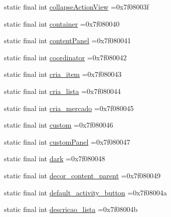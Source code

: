 \begin{DoxyCompactItemize}
static final int \mbox{\hyperlink{classbr_1_1unb_1_1cic_1_1mp_1_1marketmaster_1_1R_1_1id_aaf084224721b052286e8705de8739a77}{collapse\+Action\+View}} =0x7f08003f
\item 
static final int \mbox{\hyperlink{classbr_1_1unb_1_1cic_1_1mp_1_1marketmaster_1_1R_1_1id_acba46c2bdac6578a3fc3a2d7f2d78f9a}{container}} =0x7f080040
\item 
static final int \mbox{\hyperlink{classbr_1_1unb_1_1cic_1_1mp_1_1marketmaster_1_1R_1_1id_a7e37b4ff866fd1ce679cc51fcad78c18}{content\+Panel}} =0x7f080041
\item 
static final int \mbox{\hyperlink{classbr_1_1unb_1_1cic_1_1mp_1_1marketmaster_1_1R_1_1id_a469dc3e9f3bf441afc564ad10ce01b97}{coordinator}} =0x7f080042
\item 
static final int \mbox{\hyperlink{classbr_1_1unb_1_1cic_1_1mp_1_1marketmaster_1_1R_1_1id_a96395cca1682b29df0b613cd0c5c5503}{cria\+\_\+item}} =0x7f080043
\item 
static final int \mbox{\hyperlink{classbr_1_1unb_1_1cic_1_1mp_1_1marketmaster_1_1R_1_1id_a8b5fad949e93880f3bf9bf0ee85547c4}{cria\+\_\+lista}} =0x7f080044
\item 
static final int \mbox{\hyperlink{classbr_1_1unb_1_1cic_1_1mp_1_1marketmaster_1_1R_1_1id_a22bc94d6375768253800e85274fd065b}{cria\+\_\+mercado}} =0x7f080045
\item 
static final int \mbox{\hyperlink{classbr_1_1unb_1_1cic_1_1mp_1_1marketmaster_1_1R_1_1id_ada4171f719d419d6c221619ed4769299}{custom}} =0x7f080046
\item 
static final int \mbox{\hyperlink{classbr_1_1unb_1_1cic_1_1mp_1_1marketmaster_1_1R_1_1id_af63db390092d1162822d44afebe7021a}{custom\+Panel}} =0x7f080047
\item 
static final int \mbox{\hyperlink{classbr_1_1unb_1_1cic_1_1mp_1_1marketmaster_1_1R_1_1id_ab54115cd12f097410e75a7ac5cc2c3a6}{dark}} =0x7f080048
\item 
static final int \mbox{\hyperlink{classbr_1_1unb_1_1cic_1_1mp_1_1marketmaster_1_1R_1_1id_afb6d6d0a58595100640a509b062da486}{decor\+\_\+content\+\_\+parent}} =0x7f080049
\item 
static final int \mbox{\hyperlink{classbr_1_1unb_1_1cic_1_1mp_1_1marketmaster_1_1R_1_1id_aaa0fef59e5fa318e3cf0fb66a13d3eb6}{default\+\_\+activity\+\_\+button}} =0x7f08004a
\item 
static final int \mbox{\hyperlink{classbr_1_1unb_1_1cic_1_1mp_1_1marketmaster_1_1R_1_1id_a69c593a01eff4172527f5c04b34ed645}{descricao\+\_\+lista}} =0x7f08004b
\item 

\end{DoxyCompactItemize}
